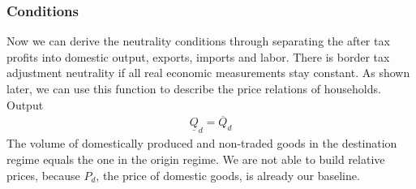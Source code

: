 \subsubsection*{Conditions}
Now we can derive the neutrality conditions through separating the after tax profits into domestic output, exports, imports and labor. There is border tax adjustment neutrality if all real economic measurements stay constant. As shown later, we can use this function to describe the price relations of households.\\

\noindent Output
\begin{equation}\label{P.Out}
\begin{aligned}
\underline Q_d = \overline Q_d
\end{aligned}
\end{equation}
The volume of domestically produced and non-traded goods in the destination regime equals the one in the origin regime. We are not able to build relative prices, because $P_d$, the price of domestic goods, is already our baseline.\\

